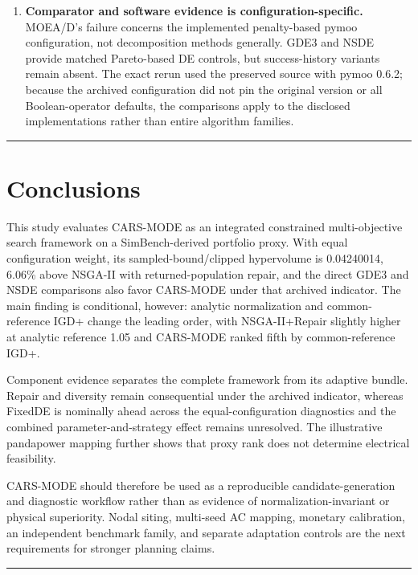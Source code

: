\documentclass[energies,article,submit,moreauthors]{Definitions/mdpi}
\begin{document}
\begin{enumerate}
\item
  \textbf{Comparator and software evidence is configuration-specific.} MOEA/D's failure concerns the implemented penalty-based pymoo configuration, not decomposition methods generally. GDE3 and NSDE provide matched Pareto-based DE controls, but success-history variants remain absent. The exact rerun used the preserved source with pymoo 0.6.2; because the archived configuration did not pin the original version or all Boolean-operator defaults, the comparisons apply to the disclosed implementations rather than entire algorithm families.
\end{enumerate}

\begin{center}\rule{0.5\linewidth}{0.5pt}\end{center}

\section{Conclusions}\label{conclusions}

This study evaluates CARS-MODE as an integrated constrained multi-objective search framework on a SimBench-derived portfolio proxy. With equal configuration weight, its sampled-bound/clipped hypervolume is 0.04240014, 6.06\% above NSGA-II with returned-population repair, and the direct GDE3 and NSDE comparisons also favor CARS-MODE under that archived indicator. The main finding is conditional, however: analytic normalization and common-reference IGD+ change the leading order, with NSGA-II+Repair slightly higher at analytic reference 1.05 and CARS-MODE ranked fifth by common-reference IGD+.

Component evidence separates the complete framework from its adaptive bundle. Repair and diversity remain consequential under the archived indicator, whereas FixedDE is nominally ahead across the equal-configuration diagnostics and the combined parameter-and-strategy effect remains unresolved. The illustrative pandapower mapping further shows that proxy rank does not determine electrical feasibility.

CARS-MODE should therefore be used as a reproducible candidate-generation and diagnostic workflow rather than as evidence of normalization-invariant or physical superiority. Nodal siting, multi-seed AC mapping, monetary calibration, an independent benchmark family, and separate adaptation controls are the next requirements for stronger planning claims.

\begin{center}\rule{0.5\linewidth}{0.5pt}\end{center}
\end{document}
